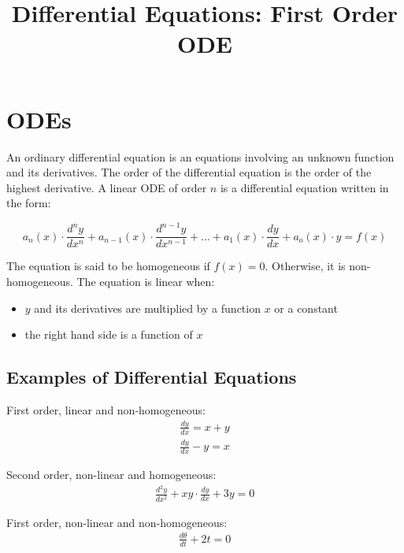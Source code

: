 \documentclass{article}
\title{Differential Equations: First Order ODE}
\begin{document}
\maketitle
\tableofcontents
\pagebreak

\section{ODEs}
An ordinary differential equation is an equations involving an unknown
function and its derivatives. The order of the differential equation
is the order of the highest derivative. A linear ODE of order $n$ is
a differential equation written in the form:


\begin{equation}
  a_n(x) \cdot \frac{d^{n}y}{dx^{n}} 
  + a_{n-1}(x) \cdot \frac{d^{n-1}y}{dx^{n-1}} 
  + ...
  + a_1(x) \cdot \frac{dy}{dx} 
  + a_o(x) \cdot y
  = f(x)
\end{equation}

\vspace{1.5ex}

The equation is said to be homogeneous if $f(x) = 0$. Otherwise, it is
non-homogeneous. The equation is linear when:
\begin{itemize}
  \item $y$ and its derivatives are multiplied by a function $x$ or 
    a constant
  \item the right hand side is a function of $x$
\end{itemize}

\subsection{Examples of Differential Equations}

First order, linear and non-homogeneous:
\begin{gather*}
  \frac{dy}{dx} = x + y \\[3pt]
  \frac{dy}{dx} - y = x
\end{gather*}

Second order, non-linear and homogeneous:
\begin{gather*}
  \frac{d^2y}{dx^2} + xy \cdot \frac{dy}{dx} + 3y = 0
\end{gather*}

First order, non-linear and non-homogeneous:
\begin{gather*}
  \frac{d \theta}{dt} + 2t = 0
\end{gather*}
\end{document}
